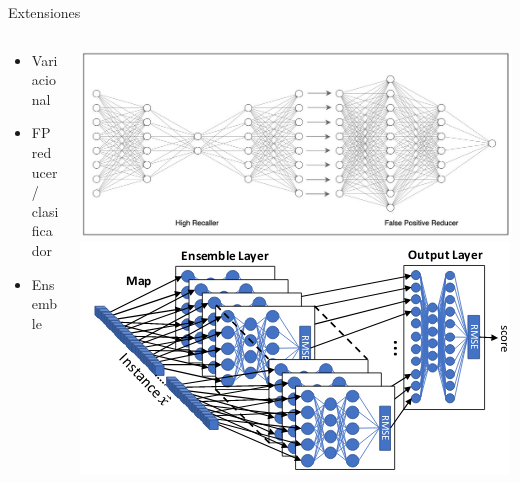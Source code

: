 \documentclass[13.5pt,aspectratio=169]{beamer}
\begin{document}
     \begin{frame}{Extensiones}
      \begin{columns}
         \begin{column}{.3\linewidth}
            \begin{itemize}
               \item[1.] Variacional\vspace{1em}
               \item[2.] FP reducer/ clasificador\vspace{1em}
               \item[3.] Ensemble
            \end{itemize}
         \end{column}\hfill
         \begin{column}{.5\linewidth}
         \includegraphics[width=\linewidth]{images/highrecaller.jpeg} 
         \includegraphics[width=\linewidth]{images/kitsune.png} 
      \end{column}
      \end{columns}

      
      
     \end{frame}
     
\end{document}
